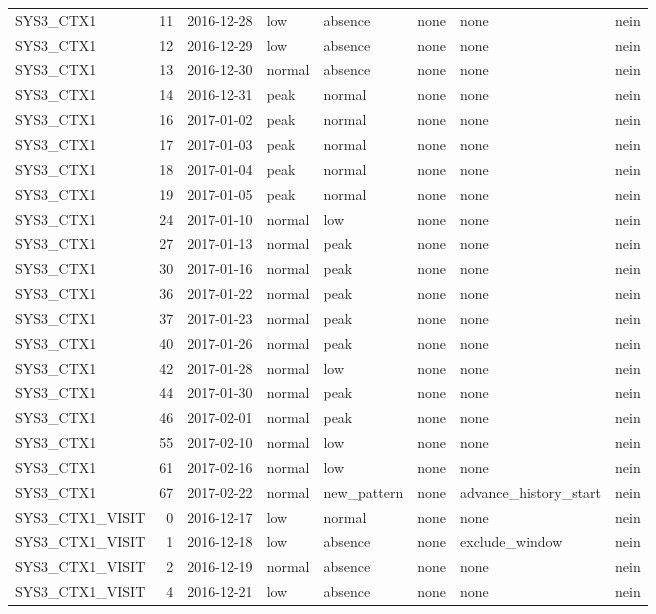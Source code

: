 \begin{tabular}{lrllllll}
SYS3\_CTX1 & 11 & 2016-12-28 & low & absence & none & none & nein \\
SYS3\_CTX1 & 12 & 2016-12-29 & low & absence & none & none & nein \\
SYS3\_CTX1 & 13 & 2016-12-30 & normal & absence & none & none & nein \\
SYS3\_CTX1 & 14 & 2016-12-31 & peak & normal & none & none & nein \\
SYS3\_CTX1 & 16 & 2017-01-02 & peak & normal & none & none & nein \\
SYS3\_CTX1 & 17 & 2017-01-03 & peak & normal & none & none & nein \\
SYS3\_CTX1 & 18 & 2017-01-04 & peak & normal & none & none & nein \\
SYS3\_CTX1 & 19 & 2017-01-05 & peak & normal & none & none & nein \\
SYS3\_CTX1 & 24 & 2017-01-10 & normal & low & none & none & nein \\
SYS3\_CTX1 & 27 & 2017-01-13 & normal & peak & none & none & nein \\
SYS3\_CTX1 & 30 & 2017-01-16 & normal & peak & none & none & nein \\
SYS3\_CTX1 & 36 & 2017-01-22 & normal & peak & none & none & nein \\
SYS3\_CTX1 & 37 & 2017-01-23 & normal & peak & none & none & nein \\
SYS3\_CTX1 & 40 & 2017-01-26 & normal & peak & none & none & nein \\
SYS3\_CTX1 & 42 & 2017-01-28 & normal & low & none & none & nein \\
SYS3\_CTX1 & 44 & 2017-01-30 & normal & peak & none & none & nein \\
SYS3\_CTX1 & 46 & 2017-02-01 & normal & peak & none & none & nein \\
SYS3\_CTX1 & 55 & 2017-02-10 & normal & low & none & none & nein \\
SYS3\_CTX1 & 61 & 2017-02-16 & normal & low & none & none & nein \\
SYS3\_CTX1 & 67 & 2017-02-22 & normal & new\_pattern & none & advance\_history\_start & nein \\
SYS3\_CTX1\_VISIT & 0 & 2016-12-17 & low & normal & none & none & nein \\
SYS3\_CTX1\_VISIT & 1 & 2016-12-18 & low & absence & none & exclude\_window & nein \\
SYS3\_CTX1\_VISIT & 2 & 2016-12-19 & normal & absence & none & none & nein \\
SYS3\_CTX1\_VISIT & 4 & 2016-12-21 & low & absence & none & none & nein \\

\end{tabular}
